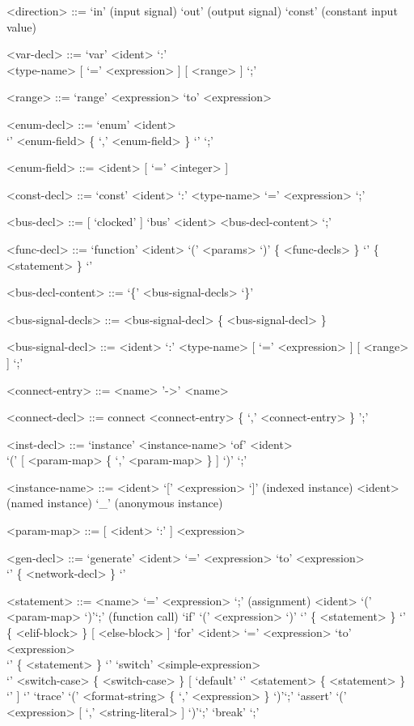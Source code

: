 \documentclass{article}
\begin{document}
\begin{grammar}
  <direction> ::= `in' (input signal)
  \alt `out' (output signal)
  \alt `const' (constant input value)  

  <var-decl> ::= `var' <ident> `:' \\ <type-name> [ `=' <expression> ] [ <range> ] `;'

  <range> ::= `range' <expression> `to' <expression>

  <enum-decl> ::= `enum' <ident> \\ `{' <enum-field> \{ `,' <enum-field>  \} `}' `;'

  <enum-field> ::= <ident> [ `=' <integer> ]
  
  <const-decl> ::= `const' <ident> `:' <type-name> `=' <expression> `;'

  <bus-decl> ::= [ `clocked' ] `bus' <ident> <bus-decl-content> `;'

  <func-decl> ::= `function' <ident> `(' <params> `)' \{ <func-decls> \} `{' \{ <statement> \}  `}'

  <bus-decl-content> ::= `\{' <bus-signal-decls> `\}'

  <bus-signal-decls> ::= <bus-signal-decl> \{ <bus-signal-decl> \}

  <bus-signal-decl> ::= <ident> `:' <type-name> [ `=' <expression> ] [ <range> ] `;'

  <connect-entry> ::= <name> '->' <name>

  <connect-decl> ::= connect <connect-entry> \{ `,' <connect-entry> \} ';'

  <inst-decl> ::= `instance' <instance-name> `of' <ident> \\`(' [ <param-map> 
  \{ `,' <param-map> \} ] `)' `;'

  <instance-name> ::= <ident> `[' <expression> `]' (indexed instance)
  \alt <ident> (named instance)
  \alt `_' (anonymous instance)

  <param-map> ::= [ <ident> `:' ] <expression>

  <gen-decl> ::= `generate' <ident> `=' <expression> `to' <expression> \\ `{' \{ <network-decl> \} `}'

  <statement> ::= <name> `=' <expression> `;' (assignment)
  \alt <ident> `(' <param-map> `)'`;' (function call) 
  \alt `if' `(' <expression> `)' `{' \{ <statement> \} `}' \\ \{ <elif-block>
    \} [ <else-block> ]
  \alt `for' <ident> `=' <expression> `to' <expression> \\ `{' \{ <statement> \} `}'
  \alt `switch' <simple-expression> \\ `{' <switch-case> \{ <switch-case> \} [ `default' `{' <statement> \{ <statement> \} `}' ] `}'
  \alt `trace' `(' <format-string> \{ `,' <expression> \} `)'`;'
  \alt `assert' `(' <expression> [ `,' <string-literal> ] `)'`;'
  \alt `break' `;'


\end{grammar}
\end{document}
